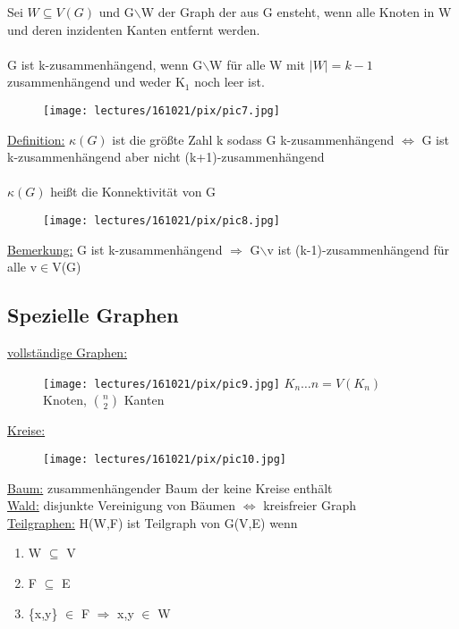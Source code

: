 Sei $W \subseteq V(G)$ und G$\backslash$W der Graph der aus G ensteht, wenn alle Knoten in W und deren inzidenten Kanten entfernt werden.
\\\\
G ist k-zusammenhängend, wenn G$\backslash$W für alle W mit $|W| = k-1$ zusammenhängend und weder K$_1$ noch leer ist.
\begin{figure}[htp]
\centering
\texttt{[image: lectures/161021/pix/pic7.jpg]}
\end{figure}

\underline{Definition:} $\kappa (G)$ ist die größte Zahl k sodass G k-zusammenhängend $\Leftrightarrow$ G ist k-zusammenhängend aber nicht (k+1)-zusammenhängend
\\\\
$\kappa(G)$ heißt die Konnektivität von G
\begin{figure}[htp]
\centering
\texttt{[image: lectures/161021/pix/pic8.jpg]}
\end{figure}

\underline{Bemerkung:} G ist k-zusammenhängend $\Rightarrow$ G$\backslash$v ist (k-1)-zusammenhängend für alle v$\in$V(G)

\newpage
\subsection{Spezielle Graphen}

\underline{vollständige Graphen:}
\begin{figure}[htp]
\centering
\texttt{[image: lectures/161021/pix/pic9.jpg]}
$K_n … n=V(K_n)$ Knoten, $\binom{n}{2}$ Kanten
\end{figure}

\underline{Kreise:}
\begin{figure}[htp]
\centering
\texttt{[image: lectures/161021/pix/pic10.jpg]}
\end{figure}

\underline{Baum:} zusammenhängender Baum der keine Kreise enthält\\
\underline{Wald:} disjunkte Vereinigung von Bäumen $\Leftrightarrow$ kreisfreier Graph\\
\underline{Teilgraphen:} H(W,F) ist Teilgraph von G(V,E) wenn
\begin{enumerate}
	\item W $\subseteq$ V
	\item F $\subseteq$ E
	\item \{x,y\} $\in$ F $\Rightarrow$ x,y $\in$ W
\end{enumerate}

